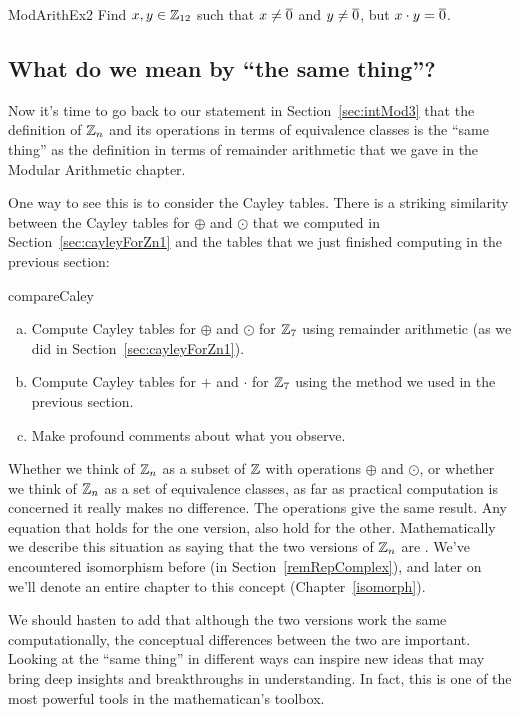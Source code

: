 \begin{exercise}{ModArithEx2}  
Find $x,y \in \mathbb{Z}_{12}$ such that $x \neq \overline{0}$ and $y \neq \overline{0}$, but $x \cdot y = \overline{0}$.
\end{exercise}

\subsection{What do we mean by ``the same thing''?}\label{sec:theSameThing}
Now it's time to go back to our statement in Section~\ref{sec:intMod3} that the definition of $\mathbb{Z}_n$ and its operations in terms of equivalence classes is the ``same thing'' as the definition in terms of remainder arithmetic that we gave in the Modular Arithmetic chapter.

One way to see this is to consider the Cayley tables. There is a striking similarity between the Cayley tables for $\oplus$ and $\odot$ that we computed in Section~\ref{sec:cayleyForZn1} and the tables that we just finished computing in the previous section:

\begin{exercise}{compareCaley}
\begin{enumerate}[(a)]
\item
Compute Cayley tables for $\oplus$ and $\odot$ for $\mathbb{Z}_7$ using remainder arithmetic (as we did in Section~\ref{sec:cayleyForZn1}).
\item
Compute Cayley tables for $+$ and $\cdot$ for $\mathbb{Z}_7$ using the method we used in the previous section.
\item
Make profound comments about what you observe.
\end{enumerate}
\end{exercise}

Whether we think of $\mathbb{Z}_n$ as a subset of $\mathbb{Z}$ with operations $\oplus$ and $\odot$, or whether we think of $\mathbb{Z}_n$ as a set of equivalence classes, as far as practical computation is concerned it really makes no difference. The operations give the same result. Any equation that holds for the one version, also hold for the other. Mathematically we describe this situation as saying that the two versions of $\mathbb{Z}_n$ are . We've encountered isomorphism before (in Section~\ref{remRepComplex}), and later on we'll denote an entire chapter to this concept (Chapter~\ref{isomorph}).

We should hasten to add that although the two versions work the same computationally, the conceptual differences between the two are important. Looking at the ``same thing'' in different ways can inspire new ideas that may bring deep insights and breakthroughs in understanding.  In fact, this is one of the most powerful tools in the mathematican's toolbox. 

